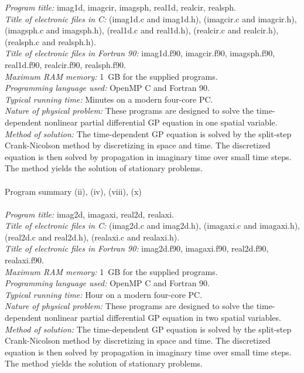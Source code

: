 \documentclass[onecolumn,3p]{elsarticle}
\begin{document}
\begin{small}
\noindent
{\em Program title:} imag1d, imagcir, imagsph, real1d, realcir, realsph.\\
{\em Title of electronic files in C:} (imag1d.c and imag1d.h), (imagcir.c and imagcir.h), (imagsph.c and imagsph.h), (real1d.c and real1d.h), (realcir.c and realcir.h), (realsph.c and realsph.h).\\
{\em Title of electronic files in Fortran 90:} imag1d.f90, imagcir.f90, imagsph.f90, real1d.f90, realcir.f90, realsph.f90.\\
{\em Maximum RAM memory:} 1~GB for the supplied programs.\\
{\em Programming language used:} OpenMP C and Fortran 90.\\
{\em Typical running time:} Minutes on a modern four-core PC.\\
{\em Nature of physical problem:} These programs are designed to solve the time-dependent nonlinear partial differential GP equation in one spatial variable. \\
{\em Method of solution:} The time-dependent GP equation is solved by the split-step Crank-Nicolson method by discretizing in space and time. The discretized equation is then solved by propagation in imaginary time over small time steps. The method yields the solution of stationary problems.\\

\noindent\\
Program summary (ii), (iv), (viii), (x)\\
\\
\noindent
{\em Program title:} imag2d, imagaxi, real2d, realaxi.\\
{\em Title of electronic files in C:} (imag2d.c and imag2d.h), (imagaxi.c and imagaxi.h), (real2d.c and real2d.h), (realaxi.c and realaxi.h). \\
{\em Title of electronic files in Fortran 90:} imag2d.f90, imagaxi.f90, real2d.f90, realaxi.f90. \\
{\em Maximum RAM memory:} 1~GB for the supplied programs.\\
{\em Programming language used:} OpenMP C and Fortran 90.\\
{\em Typical running time:} Hour on a modern four-core PC.\\
{\em Nature of physical problem:} These programs are designed to solve the time-dependent nonlinear partial differential GP equation in two spatial variables. \\
{\em Method of solution:} The time-dependent GP equation is solved by the split-step Crank-Nicolson method by discretizing in space and time. The discretized equation is then solved by propagation in imaginary time over small time steps. The method yields the solution of stationary problems.\\



\end{small}
\end{document}
